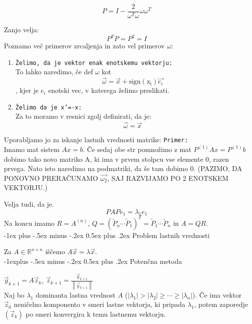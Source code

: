 \documentclass[12pt,landscape]{article}
\makeatletter
\renewcommand{\section}{\@startsection{section}{1}{0mm}%
                                {-1ex plus -.5ex minus -.2ex}%
                                {0.5ex plus .2ex}%
                                {\normalfont\large\bfseries}}
\renewcommand{\subsection}{\@startsection{subsection}{2}{0mm}%
                                {-1explus -.5ex minus -.2ex}%
                                {0.5ex plus .2ex}%
                                {\normalfont\normalsize\bfseries}}
\newcommand{\norm}[1]{\left\lVert#1\right\rVert}
\newcommand{\R}{\mathbb{R}}
\makeatother
\begin{document}
\begin{multicols}{3}
$$P=I-\frac{2}{\omega^T \omega}\omega \omega^T$$

Zanjo velja:
$$P^TP=P^2=I$$
Poznamo več primerov zrcaljenja in zato vel primerov $\omega$:
\begin{enumerate}
\item \texttt{Želimo, da je vektor enak enotskemu vektorju:}\\
To lahko naredimo, če def $\omega$ kot 
$$\vec{\omega} =\vec{x}+\mathrm{sign(x_i)}\vec{e_i}$$, kjer je $e_i$ enotski vec, v katerega želimo preslikati.
\item \texttt{Želimo da je x'=-x:}\\
Za to moramo v resnici zgolj definirati, da je:
$$\vec{\omega}=\vec{x}$$
\end{enumerate}
Uporabljamo jo za iskanje lastnih vrednosti matrike:
\texttt{Primer:} \\
Imamo mat sistem $Ax=b$. Če sedaj obe str pomnožimo z mat $P^{(1)}Ax=P^{(1)}b$ dobimo tako novo matriko A, ki ima v prvem stolpcu vse elemente 0, razen prvega. Nato isto naredimo na podmatriki, da še tam dobimo 0. (PAZIMO, DA PONOVNO PRERAČUNAMO $\vec{\omega_2}$, SAJ RAZVIJAMO PO 2 ENOTSKEM VEKTORJU.)

Velja tudi, da je.
$$PAPe_1=\lambda_1 e_1$$
Na koncu imamo $R = A^{(n)}$, $Q = (\tilde P_n \cdots \tilde P_1)^T = \tilde P_1 \cdots \tilde P_n$ in $A = QR$. \medskip \\
\section{Problem lastnih vrednosti}

Za $A \in \R^{n \times n}$ iščemo $A \vec x = \lambda \vec x$. \medskip \\

\subsection{Potenčna metoda}

$\vec y_{k+1} = A \vec z_k$, \quad $\vec z_{k+1} = \frac{\vec y_{k+1}}{\norm{\vec y_{k+1}}}$ \medskip \\

Naj bo $\lambda_1$ dominanta lastna vrednost $A$ ($|\lambda_1| > |\lambda_2| \geq \cdots \geq |\lambda_n|$). Če ima vektor $\vec z_0$ neničelno komponento v smeri lastne vektorja, ki pripada $\lambda_1$, potem zaporedje $(\vec z_k)$ po smeri konvergira k temu lastnemu vektorju. \medskip \\


\end{multicols}
\end{document}
